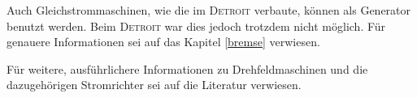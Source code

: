 Auch Gleichstrommaschinen, wie die im \textsc{Detroit} verbaute, können als Generator benutzt werden. Beim \textsc{Detroit} war dies jedoch trotzdem nicht möglich. Für genauere Informationen sei auf das Kapitel \ref{bremse} verwiesen.

Für weitere, ausführlichere Informationen zu Drehfeldmaschinen und die dazugehörigen Stromrichter sei auf die Literatur \cite{elektrischeantriebe} verwiesen.

\newpage
